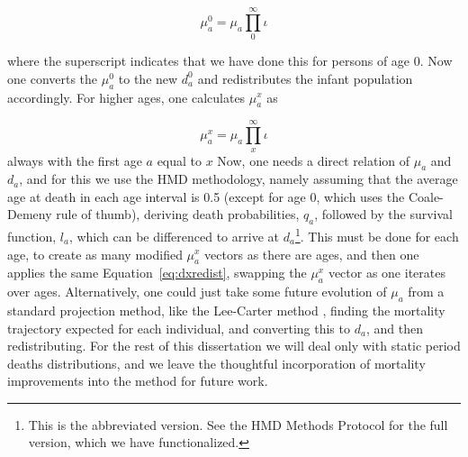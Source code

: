 \begin{equation}
\mu_a^0 = \mu_a \prod _0 ^\infty \iota 
\end{equation}

where the superscript indicates that we have done this for persons of age 0. Now
one converts the $\mu _a^0$ to the new $d_a^0$ and redistributes the infant
population accordingly. For higher ages, one calculates $\mu_a^x$ as

\begin{equation}
\mu_a^x = \mu_a \prod _x ^\infty \iota 
\end{equation}
always with the first age $a$ equal to $x$
Now, one needs a direct relation of $\mu _a$ and $d_a$, and for this we use the
HMD methodology, namely assuming that the average age at death in each age
interval is 0.5 (except for age 0, which uses the Coale-Demeny rule of thumb),
deriving death probabilities, $q_a$, followed by the survival function, $l_a$,
which can be differenced to arrive at $d_a$\footnote{This is the abbreviated
version. See the HMD Methods Protocol for the full version, which we have
functionalized.}. This must be done for each age, to create as many modified
$\mu _a^x $ vectors as there are ages, and then one applies the same
Equation~\ref{eq:dxredist}, swapping the $\mu _a^x$ vector as one iterates over
ages. Alternatively, one could just take some future evolution of $\mu_a$ from a
standard projection method, like the Lee-Carter method \citep{lee1992modeling},
finding the mortality trajectory expected for each individual, and converting
this to $d_a$, and then redistributing. For the rest of this dissertation we
will deal only with static period deaths distributions, and we leave the
thoughtful incorporation of mortality improvements into the method for future
work.
